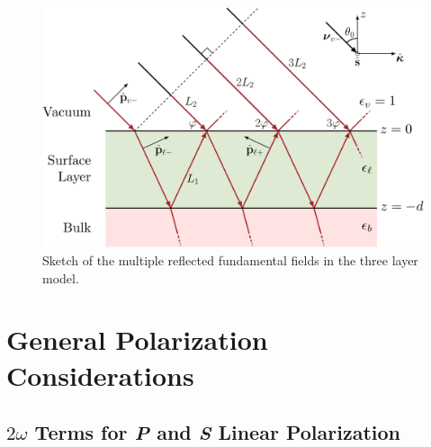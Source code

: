 \documentclass[aps,pra,10pt,amsmath,twocolumn,letterpaper]{revtex4-1}
\begin{document}
\begin{figure}[t]
\centering 
\includegraphics[width=\linewidth]{diag-3layer_MR_1w}
\caption{Sketch of the multiple reflected fundamental fields in the three layer
model.}\label{fig:MR3layer1w}
\end{figure}




\section{General Polarization Considerations}


\subsection{\texorpdfstring{$2\omega$}{2w} Terms for \emph{P} and \emph{S}
Linear Polarization}
\end{document}
